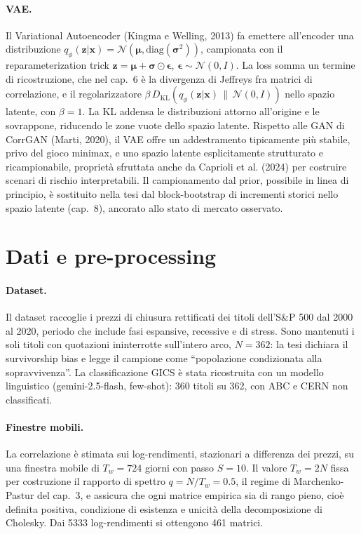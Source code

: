 \paragraph{VAE.} Il Variational Autoencoder (Kingma e Welling, 2013) fa emettere all'encoder una distribuzione $q_\phi(\mathbf{z}|\mathbf{x}) = \mathcal{N}(\boldsymbol{\mu}, \mathrm{diag}(\boldsymbol{\sigma}^2))$, campionata con il reparameterization trick $\mathbf{z} = \boldsymbol{\mu} + \boldsymbol{\sigma} \odot \boldsymbol{\epsilon}$, $\boldsymbol{\epsilon} \sim \mathcal{N}(0, I)$. La loss somma un termine di ricostruzione, che nel cap.~6 è la divergenza di Jeffreys fra matrici di correlazione, e il regolarizzatore $\beta\, D_{\mathrm{KL}}(q_\phi(\mathbf{z}|\mathbf{x})\,\|\,\mathcal{N}(0, I))$ nello spazio latente, con $\beta = 1$. La KL addensa le distribuzioni attorno all'origine e le sovrappone, riducendo le zone vuote dello spazio latente. Rispetto alle GAN di CorrGAN (Marti, 2020), il VAE offre un addestramento tipicamente più stabile, privo del gioco minimax, e uno spazio latente esplicitamente strutturato e ricampionabile, proprietà sfruttata anche da Caprioli et al. (2024) per costruire scenari di rischio interpretabili. Il campionamento dal prior, possibile in linea di principio, è sostituito nella tesi dal block-bootstrap di incrementi storici nello spazio latente (cap.~8), ancorato allo stato di mercato osservato.

\section{Dati e pre-processing}

\paragraph{Dataset.} Il dataset raccoglie i prezzi di chiusura rettificati dei titoli dell'S\&P 500 dal 2000 al 2020, periodo che include fasi espansive, recessive e di stress. Sono mantenuti i soli titoli con quotazioni ininterrotte sull'intero arco, $N = 362$: la tesi dichiara il survivorship bias e legge il campione come ``popolazione condizionata alla sopravvivenza''. La classificazione GICS è stata ricostruita con un modello linguistico (gemini-2.5-flash, few-shot): 360 titoli su 362, con ABC e CERN non classificati.

\paragraph{Finestre mobili.} La correlazione è stimata sui log-rendimenti, stazionari a differenza dei prezzi, su una finestra mobile di $T_w = 724$ giorni con passo $S = 10$. Il valore $T_w = 2N$ fissa per costruzione il rapporto di spettro $q = N/T_w = 0.5$, il regime di Marchenko-Pastur del cap.~3, e assicura che ogni matrice empirica sia di rango pieno, cioè definita positiva, condizione di esistenza e unicità della decomposizione di Cholesky. Dai 5333 log-rendimenti si ottengono 461 matrici.

